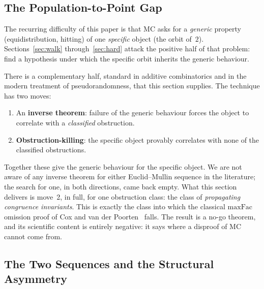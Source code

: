 \subsection{The Population-to-Point Gap}
\label{sec:pop-to-point}

The recurring difficulty of this paper is that MC asks for a
\emph{generic} property (equidistribution, hitting) of one
\emph{specific} object (the orbit of~$2$).  Sections~\ref{sec:walk}
through~\ref{sec:hard} attack the positive half of that problem:
find a hypothesis under which the specific orbit inherits the generic
behaviour.

There is a complementary half, standard in additive combinatorics and
in the modern treatment of pseudorandomness, that this section
supplies.  The technique has two moves:

\begin{enumerate}[nosep]
\item An \textbf{inverse theorem}: failure of the generic behaviour
  forces the object to correlate with a \emph{classified} obstruction.
\item \textbf{Obstruction-killing}: the specific object provably
  correlates with none of the classified obstructions.
\end{enumerate}

\noindent
Together these give the generic behaviour for the specific object.  We
are not aware of any inverse theorem for either Euclid--Mullin sequence
in the literature; the search for one, in both directions, came back
empty.  What this section delivers is move~2, in full, for one
obstruction class: the class of \emph{propagating congruence
invariants}.  This is exactly the class into which the classical
$\mathrm{maxFac}$ omission proof of Cox and van der
Poorten~\cite{CoxVdP1968} falls.  The result is a no-go theorem, and
its scientific content is entirely negative: it says where a disproof
of MC cannot come from.

\subsection{The Two Sequences and the Structural Asymmetry}
\label{sec:two-sequences}

